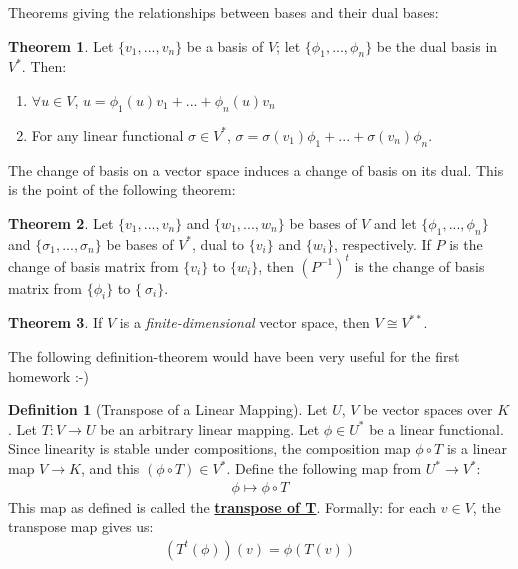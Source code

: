 \documentclass[11pt]{scrartcl}
\theoremstyle{definition}
\newtheorem{theorem}{Theorem}
\newtheorem{definition}{Definition}
\theoremstyle{remark}
\newcommand{\dfn}[1]{\textbf{\underline{#1}}}
\begin{document}
{Theorems giving the relationships between bases and their dual bases: 
\begin{theorem}
	Let $\{ v_1, ..., v_n \}$ be a basis of $V$; let $\{ \phi_1 , ..., \phi_n \}$ be the dual basis in $V^*$. Then: 
	\begin{enumerate}[noitemsep]
		\item $\forall u \in V$, $u  = \phi_1(u)v_1 + ... + \phi_n(u) v_n$ 
		\item For any linear functional $\sigma \in V^*$, $\sigma = \sigma(v_1) \phi_1 + ... + \sigma(v_n) \phi_n$. 
	\end{enumerate}
\end{theorem}
	The change of basis on a vector space induces a change of basis on its dual. This is the point of the following theorem: 
\begin{theorem}
	Let $\{ v_1, ..., v_n \}$ and $\{ w_1, ..., w_n \}$ be bases of $V$ and let $\{ \phi_1, ... , \phi_n \}$ and $\{ \sigma_1, ..., \sigma_n \}$ be bases of $V^*$, dual to $\{ v_i \}$ and $\{ w_i \}$, respectively. If $P$ is the change of basis matrix from $\{ v_i \}$ to $\{w_i \}$, then $(P^{-1})^t$ is the change of basis matrix from $\{ \phi_i \}$ to $\{\ \sigma_i \}$. 
\end{theorem}

\begin{theorem}
	If $V$ is a \emph{finite-dimensional} vector space, then $V \cong V^{**}$. 
\end{theorem}

The following definition-theorem would have been very useful for the first homework :-) 

\begin{definition}[Transpose of a Linear Mapping] 
	Let $U$, $V$ be vector spaces over $K$. Let $T: V \rightarrow U$ be an arbitrary linear mapping. Let $\phi \in U^*$ be a linear functional. Since linearity is stable under compositions, the composition map $\phi \circ T$ is a linear map $V \rightarrow K$, and this $(\phi \circ T) \in V^*$. Define the following map from $U^* \rightarrow V^*$: 
	\begin{align*}
		\phi \mapsto \phi \circ T 
	\end{align*}
	This map as defined is called the \dfn{transpose of T}. Formally: for each $v \in V$, the transpose map gives us: 
	\begin{align}
		(T^t(\phi))(v) = \phi(T(v)) 	
	\end{align}
\end{definition}


}
\end{document}
